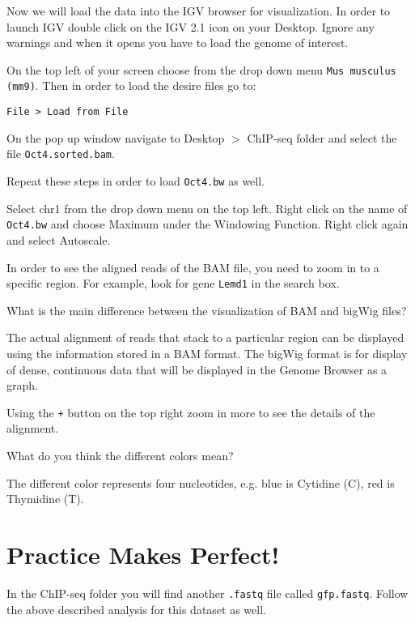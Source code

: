 \begin{steps}
Now we will load the data into the IGV browser for visualization. In order to
launch IGV double click on the IGV 2.1 icon on your Desktop. Ignore any warnings
and when it opens you have to load the genome of interest.

On the top left of your screen choose from the drop down menu \texttt{Mus musculus
(mm9)}. Then in order to load the desire files go to:

\begin{lstlisting}
File > Load from File
\end{lstlisting}

On the pop up window navigate to Desktop $>$ ChIP-seq folder and select the file
\texttt{Oct4.sorted.bam}.

Repeat these steps in order to load \texttt{Oct4.bw} as well.

Select chr1 from the drop down menu on the top left. Right click on the name of
\texttt{Oct4.bw} and choose Maximum under the Windowing Function. Right click again and
select Autoscale.

In order to see the aligned reads of the BAM file, you need to zoom in to a
specific region. For example, look for gene \texttt{Lemd1} in the search box.
\end{steps}

\begin{questions}
What is the main difference between the visualization of BAM and bigWig files?
\begin{answer}
The actual alignment of reads that stack to a particular region can be displayed
using the information stored in a BAM format.
The bigWig format is for display of dense, continuous data that will be
displayed in the Genome Browser as a graph.
\end{answer}
\end{questions}

Using the \texttt{+} button on the top right zoom in more to see the details of the alignment.

\begin{questions}
What do you think the different colors mean?
\begin{answer}
The different color represents four nucleotides, e.g. blue is Cytidine (C), red
is Thymidine (T).
\end{answer}
\end{questions}

\section{Practice Makes Perfect!}
In the ChIP-seq folder you will find another \texttt{.fastq} file called
\texttt{gfp.fastq}. Follow the above described analysis for this dataset as well.

